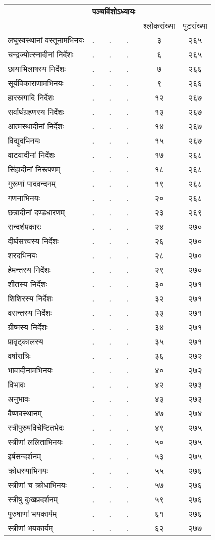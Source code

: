 \documentclass[11pt, openany]{book}
\begin{document}
\newpage

\begin{center}
\begin{tabular}{m{10em} m{2em} m{2em} m{2em} c c}
& \multicolumn{3}{c}{\textbf{\large पञ्चविंशोऽध्यायः}} & \\
& & & & श्लोकसंख्या & पुटसंख्या\\
लघुस्वस्थानां वस्तूनामभिनयः& .& .& .&३& २६५\\
चन्द्रज्योत्स्नादीनां निर्देशः& .& .& .&६ &२६५\\
छायाभिलाषस्य निर्देशः& .& .& .&७&२६६\\
सूर्यविकाराणामभिनयः& .& .& .&९& २६६\\
हारस्रगादि निर्देशः& .& .& .&१२& २६७\\
सर्वार्थग्रहणस्य निर्देशः& .& .& .&१३& २६७\\
आत्मस्थादीनां निर्देशः& .& .& .&१४& २६७\\
विद्युदभिनयः& .& .& .&१५& २६७\\
वाटवादीनां निर्देशः& .& .& .&१७ &२६८\\
सिंहादीनां निरूपणम्& .& .& .&१८& २६८\\
गुरूणां पादवन्दनम्& .& .& .&१९ &२६८\\
गणनाभिनयः& .& .& .&२०& २६८\\
छत्रादीनां दण्डधारणम्& .& .& .&२३& २६९\\
सन्दर्शप्रकारः& .& .& .&२४ &२७०\\
दीर्घसत्त्वस्य निर्देशः& .& .& .&२६& २७०\\
शरदभिनयः& .& .& .&२८ &२७०\\
हेमन्तस्य निर्देशः& .& .& .&२९ &२७०\\
शीतस्य निर्देशः& .& .& .&३० &२७१\\
शिशिरस्य निर्देशः& .& .& .&३२ &२७१\\
वसन्तस्य निर्देशः& .& .& .&३३ &२७१\\
ग्रीष्मस्य निर्देशः& .& .& .&३४ &२७१\\
प्रावृट्कालस्य& .& .& .&३५ &२७१\\
वर्षारात्रिः& .& .& .&३६ &२७२\\
भावादीनामभिनयः& .& .& .&४० &२७२\\
विभावः& .& .& .&४२ &२७३\\
अनुभावः& .& .& .&४३ &२७३\\
वैष्णवस्थानम्& .& .& .&४७ &२७४\\
स्त्रीपुरुषविचेष्टितभेदः& .& .& .&४९ &२७५\\
स्त्रीणां ललिताभिनयः& .& .& .&५० &२७५\\
इर्षसन्दर्शनम्& .& .& .&५३ &२७५\\
क्रोधस्याभिनयः& .& .& .&५५ &२७६\\
स्त्रीणां च क्रोधाभिनयः& .& .& .&५७ &२७६\\
स्त्रीषु दुःखप्रदर्शनम्& .& .& .&५९ &२७६\\
पुरुषाणां भयकार्यम्& .& .& .&६१ &२७६\\
स्त्रीणां भयकार्यम्& .& .& .&६२ &२७७
\end{tabular}
\end{center}
\end{document}
